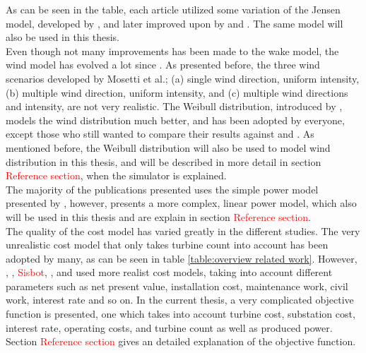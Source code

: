 \noindent As can be seen in the table, each article utilized some variation of the Jensen model, developed by \citep{Jensen}, and later improved upon by \citep{Katic} and \citep{Frandsen}. The same model will also be used in this thesis. \\

\noindent Even though not many improvements has been made to the wake model, the wind model has evolved a lot since \citep{Mosetti}. As presented before, the three wind scenarios developed by Mosetti et al.; (a) single wind direction, uniform intensity, (b) multiple wind direction, uniform intensity, and (c) multiple wind directions and intensity, are not very realistic. The Weibull distribution, introduced by \citep{Mora}, models the wind distribution much better, and has been adopted by everyone, except those who still wanted to compare their results against \citep{Mosetti} and \citep{Grady}. As mentioned before, the Weibull distribution will also be used to model wind distribution in this thesis, and will be described in more detail in section \textcolor{red}{Reference section}, when the simulator is explained. \\

\noindent The majority of the publications presented uses the simple power model presented by \citep{Mosetti}, however, \citep{Kusiak} presents a more complex, linear power model, which also will be used in this thesis and are explain in section \textcolor{red}{Reference section}.\\ 

\noindent The quality of the cost model has varied greatly in the different studies. The very unrealistic cost model that only takes turbine count into account has been adopted by many, as can be seen in table \ref{table:overview related work}. However, \citep{Mora}, \citep{Gonzales}, \textcolor{red}{Sisbot}, \citep{Saavedra-Morena}, and \citep{Chen} used more realist cost models, taking into account different parameters such as net present value, installation cost, maintenance work, civil work, interest rate and so on. In the current thesis, a very complicated objective function is presented, one which takes into account turbine cost, substation cost, interest rate, operating costs, and turbine count as well as produced power. Section \textcolor{red}{Reference section} gives an detailed explanation of the objective function. \\

